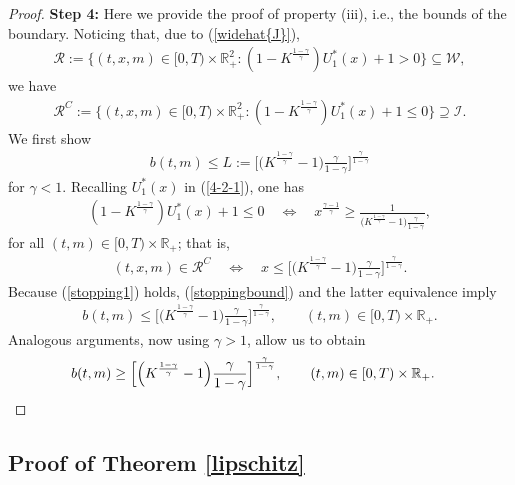 \documentclass[a4paper,11pt]{amsart}
\numberwithin{equation}{section}
\begin{document}
{\begin{proof}
\textbf{Step 4:} Here we provide the proof of property (iii), i.e., the bounds of the boundary. Noticing that, due to (\ref{widehat{J}}),
\begin{align*}
\mathcal R:=\{(t,x,m)\in[0,T)\times\mathbb R_+^2:(1-K^{\frac{1-\gamma}{\gamma}})U_1^\ast(x)+1>0\}\subseteq\mathcal W,
\end{align*}
we have
\begin{align}\label{stoppingbound}
\mathcal R^C:=\{(t,x,m)\in[0,T)\times\mathbb R_+^2:(1-K^{\frac{1-\gamma}{\gamma}})U_1^\ast(x)+1\leq0\}\supseteq\mathcal I.
\end{align}
We first show
\begin{align*}
b(t,m)\leq L:=\Big[\Big(K^{\frac{1-\gamma}{\gamma}}-1\Big)\frac{\gamma}{1-\gamma}\Big]^{\frac{\gamma}{1-\gamma}}
\end{align*}
for $\gamma<1$. Recalling $U_1^\ast(x)$ in (\ref{4-2-1}), one has
\begin{align*}
(1-K^{\frac{1-\gamma}{\gamma}})U_1^\ast(x)+1\leq0\quad\Longleftrightarrow\quad x^{\frac{\gamma-1}{\gamma}}\geq\frac{1}{\big(K^{\frac{1-\gamma}{\gamma}}-1\big)\frac{\gamma}{1-\gamma}},
\end{align*}
for all $(t,m)\in[0,T)\times\mathbb R_+$; that is,
\begin{align*}
(t,x,m)\in\mathcal R^C\quad\Longleftrightarrow\quad x\leq\Big[\Big(K^{\frac{1-\gamma}{\gamma}}-1\Big)\frac{\gamma}{1-\gamma}\Big]^{\frac{\gamma}{1-\gamma}}.
\end{align*}
Because (\ref{stopping1}) holds, (\ref{stoppingbound}) and the latter equivalence imply
\begin{align*}
b(t,m)\leq\Big[\Big(K^{\frac{1-\gamma}{\gamma}}-1\Big)\frac{\gamma}{1-\gamma}\Big]^{\frac{\gamma}{1-\gamma}},\qquad(t,m)\in[0,T)\times\mathbb R_+.
\end{align*}
Analogous arguments, now using $\gamma>1$, allow us to obtain
{
\begin{align*}
b(t,m)&\geq\Big[\Big(K^{\frac{1-\gamma}{\gamma}}-1\Big)\frac{\gamma}{1-\gamma}\Big]^{\frac{\gamma}{1-\gamma}},\qquad(t,m)\in[0,T)\times\mathbb R_+.\qedhere
\end{align*}
}
\end{proof}


\subsection{Proof of Theorem \ref{lipschitz} }\label{prolipschitz}

}
\end{document}
